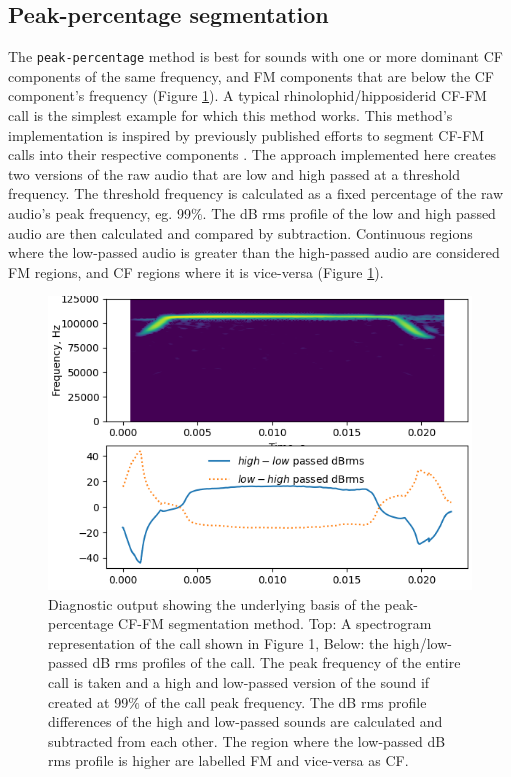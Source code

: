 \documentclass[
]{book}
\begin{document}
\hypertarget{peak-percentage-segmentation}{%
\subsection{Peak-percentage segmentation}\label{peak-percentage-segmentation}}

The \texttt{peak-percentage} method is best for sounds with one or more dominant CF components of the same frequency, and FM components that are below the CF component's frequency (Figure \ref{fig:pkpctgdiags}). A typical rhinolophid/hipposiderid CF-FM call is the simplest example for which this method works. This method's implementation is inspired by previously published efforts to segment CF-FM calls into their respective components \citep{lu2020echolocating, tian1997echolocation, schoeppler2018precise}. The approach implemented here creates two versions of the raw audio that are low and high passed at a threshold frequency. The threshold frequency is calculated as a fixed percentage of the raw audio's peak frequency, eg. 99\%. The dB rms profile of the low and high passed audio are then calculated and compared by subtraction. Continuous regions where the low-passed audio is greater than the high-passed audio are considered FM regions, and CF regions where it is vice-versa (Figure \ref{fig:pkpctgdiags}).

\begin{figure}
\includegraphics[width=8.08in]{original_papers/itsfm-paper/figures/pkpctage_profiles} \caption{Diagnostic output showing the underlying basis of the peak-percentage CF-FM segmentation method. Top: A spectrogram representation of the call shown in Figure 1, Below: the high/low-passed dB rms profiles of the call. The peak frequency of the entire call is taken and a high and low-passed version of the sound if created at 99$\%$ of the call peak frequency. The dB rms profile differences of the high and low-passed sounds are calculated and subtracted from each other. The region where the low-passed dB rms profile is higher are labelled FM and vice-versa as CF. }\label{fig:pkpctgdiags}
\end{figure}
\end{document}
